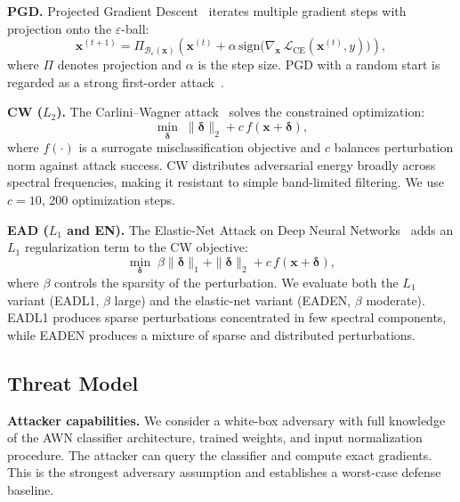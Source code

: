 \textbf{PGD.} Projected Gradient Descent~\cite{madry2018pgd} iterates
multiple gradient steps with projection onto the $\varepsilon$-ball:
\begin{equation}
  \mathbf{x}^{(t+1)} = \Pi_{\mathcal{B}_\varepsilon(\mathbf{x})}
    \!\left(\mathbf{x}^{(t)} + \alpha\,\mathrm{sign}\bigl(
    \nabla_{\mathbf{x}}\,\mathcal{L}_{\mathrm{CE}}(\mathbf{x}^{(t)}, y)
    \bigr)\right),
\end{equation}
where $\Pi$ denotes projection and $\alpha$ is the step size. PGD with a
random start is regarded as a strong first-order attack~\cite{croce2020reliable}.

\textbf{CW ($L_2$).} The Carlini--Wagner attack~\cite{carlini2017towards}
solves the constrained optimization:
\begin{equation}
  \min_{\boldsymbol{\delta}}\; \|\boldsymbol{\delta}\|_2 + c\, f(\mathbf{x} + \boldsymbol{\delta}),
\end{equation}
where $f(\cdot)$ is a surrogate misclassification objective and $c$ balances
perturbation norm against attack success. CW distributes adversarial energy
broadly across spectral frequencies, making it resistant to simple band-limited
filtering. We use $c = 10$, 200 optimization steps.

\textbf{EAD ($L_1$ and EN).} The Elastic-Net Attack on Deep Neural
Networks~\cite{chen2020ead} adds an $L_1$ regularization term to the CW
objective:
\begin{equation}
  \min_{\boldsymbol{\delta}}\; \beta\|\boldsymbol{\delta}\|_1 +
    \|\boldsymbol{\delta}\|_2 + c\, f(\mathbf{x} + \boldsymbol{\delta}),
\end{equation}
where $\beta$ controls the sparsity of the perturbation. We evaluate both the
$L_1$ variant (EADL1, $\beta$ large) and the elastic-net variant (EADEN,
$\beta$ moderate). EADL1 produces sparse perturbations concentrated in few
spectral components, while EADEN produces a mixture of sparse and distributed
perturbations.

\subsection{Threat Model}

\textbf{Attacker capabilities.} We consider a white-box adversary with full
knowledge of the AWN classifier architecture, trained weights, and input
normalization procedure. The attacker can query the classifier and compute
exact gradients. This is the strongest adversary assumption and establishes
a worst-case defense baseline.

